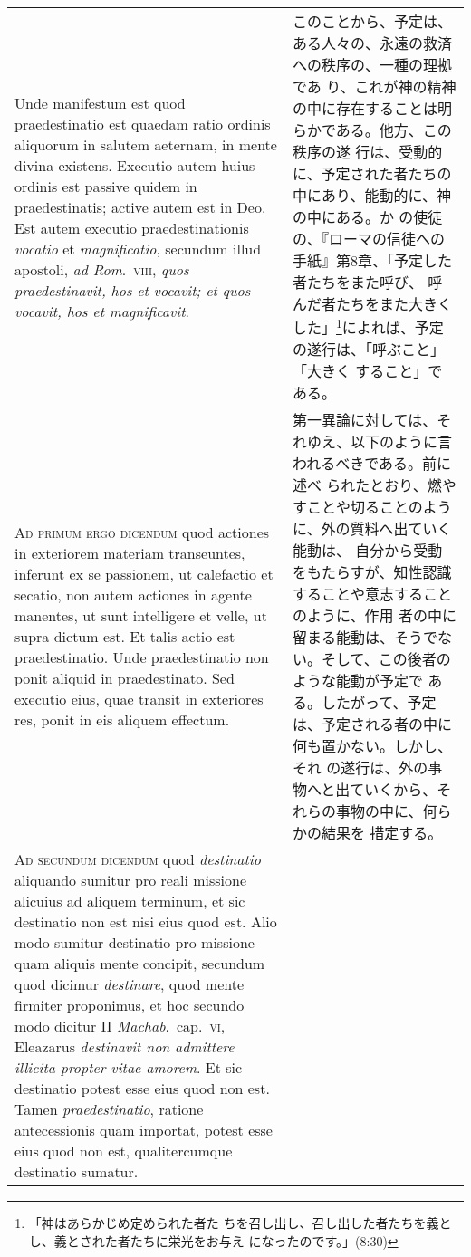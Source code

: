 \documentclass[10pt]{jsarticle} %
\begin{document}
\begin{longtable}{p{21em}p{21em}}
 \\

 Unde
manifestum est quod praedestinatio est quaedam ratio ordinis aliquorum
in salutem aeternam, in mente divina existens. Executio autem huius
ordinis est passive quidem in praedestinatis; active autem est in
Deo. Est autem executio praedestinationis {\itshape vocatio} et {\itshape magnificatio},
secundum illud apostoli, {\itshape ad Rom}.~{\scshape viii}, {\itshape quos praedestinavit, hos et
vocavit; et quos vocavit, hos et magnificavit}.


&

このことから、予定は、ある人々の、永遠の救済への秩序の、一種の理拠であ
り、これが神の精神の中に存在することは明らかである。他方、この秩序の遂
行は、受動的に、予定された者たちの中にあり、能動的に、神の中にある。か
の使徒の、『ローマの信徒への手紙』第8章、「予定した者たちをまた呼び、
呼んだ者たちをまた大きくした」\footnote{「神はあらかじめ定められた者た
ちを召し出し、召し出した者たちを義とし、義とされた者たちに栄光をお与え
になったのです。」(8:30)}によれば、予定の遂行は、「呼ぶこと」「大きく
すること」である。
 
\\


{\scshape Ad primum ergo dicendum} quod actiones in
exteriorem materiam transeuntes, inferunt ex se passionem, ut calefactio
et secatio, non autem actiones in agente manentes, ut sunt intelligere
et velle, ut supra dictum est. Et talis actio est praedestinatio. Unde
praedestinatio non ponit aliquid in praedestinato. Sed executio eius,
quae transit in exteriores res, ponit in eis aliquem effectum.


&

第一異論に対しては、それゆえ、以下のように言われるべきである。前に述べ
られたとおり、燃やすことや切ることのように、外の質料へ出ていく能動は、
自分から受動をもたらすが、知性認識することや意志することのように、作用
者の中に留まる能動は、そうでない。そして、この後者のような能動が予定で
ある。したがって、予定は、予定される者の中に何も置かない。しかし、それ
の遂行は、外の事物へと出ていくから、それらの事物の中に、何らかの結果を
措定する。

\\


{\scshape Ad secundum dicendum} quod {\itshape destinatio}
aliquando sumitur pro reali missione alicuius ad aliquem terminum, et
sic destinatio non est nisi eius quod est. Alio modo sumitur destinatio
pro missione quam aliquis mente concipit, secundum quod dicimur
{\itshape destinare}, quod mente firmiter proponimus, et hoc secundo modo dicitur
II {\itshape Machab}.~cap.~{\scshape vi}, Eleazarus {\itshape destinavit non admittere illicita propter
vitae amorem}. Et sic destinatio potest esse eius quod non est. Tamen
{\itshape praedestinatio}, ratione antecessionis quam importat, potest esse eius
quod non est, qualitercumque destinatio sumatur.



\end{longtable}
\end{document}

